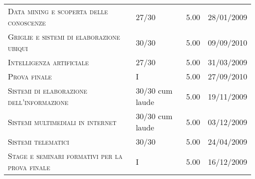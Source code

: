 \begin{tabular}{p{8cm}lll}
\textsc{Data mining e scoperta delle conoscenze}                    &  27/30            &  5.00           &     28/01/2009       \\
\textsc{Griglie e sistemi di elaborazione ubiqui}                   &  30/30            &  5.00           &     09/09/2010       \\
\textsc{Intelligenza artificiale}                                   &  27/30            &  5.00           &     31/03/2009       \\
\textsc{Prova finale}                                               &  I                &  5.00           &     27/09/2010       \\
\textsc{Sistemi di elaborazione dell'informazione}                  &  30/30 cum laude  &  5.00           &     19/11/2009       \\
\textsc{Sistemi multimediali in internet}                           &  30/30 cum laude  &  5.00           &     03/12/2009       \\
\textsc{Sistemi telematici}                                         &  30/30            &  5.00           &     24/04/2009       \\
\textsc{Stage e seminari formativi per la prova finale}             &  I                &  5.00           &     16/12/2009       \\
\end{tabular}